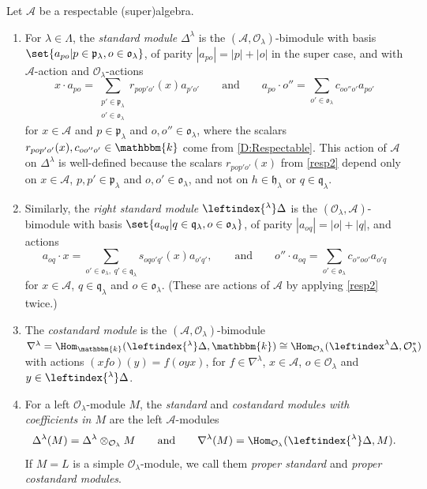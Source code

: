 \documentclass[a4paper,11pt]{amsart}
\numberwithin{equation}{subsection}
\theoremstyle{definition}
\theoremstyle{theorem}
\theoremstyle{remark}
\newcommand\CA{\mathcal{A}}
\newcommand\CO{\mathcal{O}}
\newcommand\plam[1][\lambda]{\mathfrak{p}_{#1}}
\newcommand\hlam[1][\lambda]{\mathfrak{h}_{#1}}
\newcommand\qlam[1][\lambda]{\mathfrak{q}_{#1}}
\newcommand\Olam[1][\lambda]{\CO_{#1}}
\newcommand\olam[1][\lambda]{\mathfrak{o}_{#1}}
\newcommand\kk{\mathbbm{k}}
\begin{document}
  \begin{Definition}\label{D:Standard}
   Let $\CA$ be a respectable (super)algebra.
   \begin{enumerate}[series=Defstd, label=(\alph*), ref=\autoref{D:Standard}.(\alph*)]
   \item\label{std1} For $\lambda\in\Lambda$, the \emph{standard module}
   $\Delta^\lambda$ is the $(\CA,\Olam)$-bimodule with basis
   $\set{a_{po}|p\in\plam, o\in\olam}$, of parity $|a_{po}|=|p|+|o|$ in the super case, and with $\CA$-action and
   $\Olam$-actions
   \[
        x\cdot a_{po}=\sum_{\substack{p'\in\plam\\o'\in\olam}}r_{pop'o'}(x) a_{p'o'}
        \qquad\text{and}\qquad
        a_{po}\cdot o''=\sum_{o'\in\olam}c_{oo''o'}a_{po'}
   \]
   for $x\in \CA$ and $p\in\plam$ and $o,o''\in\olam$,
   where the scalars $r_{pop'o'}(x),c_{oo''o'}\in\kk$ come from \autoref{D:Respectable}.
   This action of $\CA$ on $\Delta^\lambda$ is well-defined because the
   scalars $r_{pop'o'}(x)$ from \autoref{resp2} depend only on
   $x\in \CA$, $p, p'\in\plam$ and $o,o'\in\olam$, and not on $h\in\hlam$
   or $q\in\qlam$.

   \item \label{std2} Similarly, the \emph{right standard module} $\leftindex{^\lambda}\Delta$ is
   the $(\Olam,\CA)$-bimodule with basis
   $\set{a_{oq}|q\in\qlam, o\in\olam}$, of parity $|a_{oq}|=|o|+|q|$, and actions
   \[
         a_{oq}\cdot x=\sum_{o'\in\olam,\ q'\in\qlam}s_{oqo'q'}(x) a_{o'q'},
         \qquad\text{and}\qquad
         o''\cdot a_{oq}=\sum_{o'\in\olam}c_{o''oo'}a_{o'q}
   \]
   for $x\in \CA$, $q\in\qlam$ and $o\in\olam$.
   (These are actions of $\CA$ by applying
   \autoref{resp2} twice.)

   \item\label{std3} The \emph{costandard module} is the $(\CA,\Olam)$-bimodule
   $\nabla^\lambda=\Hom_\kk(\leftindex{^\lambda}\Delta,\kk)\cong\Hom_{\Olam}(\leftindex^{\lambda}\Delta,\Olam^*)$ with actions
   $(xfo)(y)=f(oyx)$, for $f\in\nabla^\lambda$, $x\in \CA$, $o\in\Olam$ and $y\in\leftindex{^\lambda}\Delta$.
   \item\label{std4} For a left $\Olam$-module $M$, the \emph{standard} and \emph{costandard modules
   with coefficients in $M$} are the left $\CA$-modules
   \[
     \Delta^\lambda(M)=\Delta^\lambda\otimes_{\Olam}M
     \qquad\text{and}\qquad
     \nabla^\lambda(M)=\Hom_{\Olam}(\leftindex{^\lambda}\Delta,M).
   \]
   If $M=L$ is a simple $\Olam$-module, we call them \emph{proper standard} and \emph{proper
   costandard modules}.


\end{enumerate}
\end{Definition}
\end{document}

